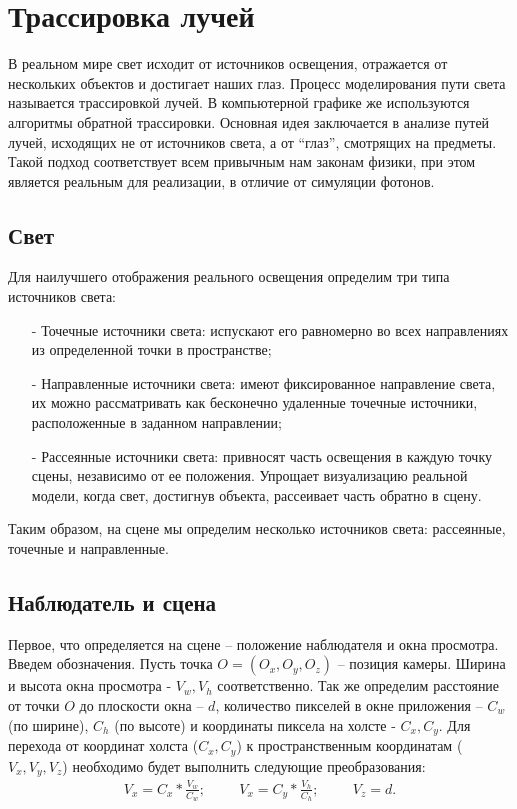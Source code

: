 \section{Трассировка лучей}

В реальном мире свет исходит от источников освещения, отражается от
нескольких объектов и достигает наших глаз. Процесс моделирования пути света называется трассировкой лучей. В компьютерной графике же используются алгоритмы обратной трассировки. Основная идея заключается в анализе путей лучей, исходящих не от источников света, а от “глаз”, смотрящих на предметы. Такой подход соответствует всем привычным нам законам физики, при этом является реальным для реализации, в отличие от симуляции фотонов. \cite{b4}

\subsection{Свет}

Для наилучшего отображения реального освещения определим три типа
источников света:
\begin{itemize}[label=\arabic*)]
	\item[-] Точечные источники света: испускают его равномерно во всех направлениях из определенной точки в пространстве;
	\item[-] Направленные источники света: имеют фиксированное направление света, их можно рассматривать как бесконечно удаленные точечные источники, расположенные в заданном направлении;
	\item[-] Рассеянные источники света: привносят часть освещения в каждую точку сцены, независимо от ее положения. Упрощает визуализацию реальной модели, когда свет, достигнув объекта, рассеивает часть обратно в сцену.
\end{itemize}

Таким образом, на сцене мы определим несколько источников света: рассеянные, точечные и направленные.

\subsection{Наблюдатель и сцена}

Первое, что определяется на сцене – положение наблюдателя и окна просмотра. Введем обозначения. Пусть точка $O = (O_{x}, O_{y}, O_{z})$ – позиция камеры. Ширина и высота окна просмотра - $V_{w}, V_{h}$ соответственно. Так же определим расстояние от точки $O$ до плоскости окна – $d$, количество пикселей в окне приложения – $C_{w}$ (по ширине), $C_{h}$ (по высоте) и координаты пиксела на холсте - $C_{x}, C_{y}$.
Для перехода от координат холста ($C_{x}, C_{y}$) к пространственным координатам ($V_{x}, V_{y}, V_{z}$) необходимо будет выполнить следующие преобразования:
\begin{gather}
	V_{x} = C_{x}*\frac{V_{w}}{C_{w}};\hspace{1cm}V_{x} = C_{y}*\frac{V_{h}}{C_{h}};\hspace{1cm}V_{z} = d.
\end{gather}

